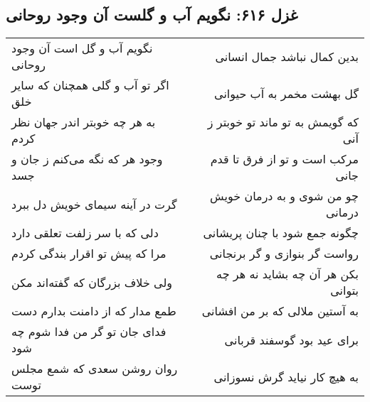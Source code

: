 \begin{center}
\section*{غزل ۶۱۶: نگویم آب و گلست آن وجود روحانی}
\label{sec:616}
\begin{longtable}{l p{0.5cm} r}
نگویم آب و گل است آن وجود روحانی
&&
بدین کمال نباشد جمال انسانی
\\
اگر تو آب و گلی همچنان که سایر خلق
&&
گل بهشت مخمر به آب حیوانی
\\
به هر چه خوبتر اندر جهان نظر کردم
&&
که گویمش به تو ماند تو خوبتر ز آنی
\\
وجود هر که نگه می‌کنم ز جان و جسد
&&
مرکب است و تو از فرق تا قدم جانی
\\
گرت در آینه سیمای خویش دل ببرد
&&
چو من شوی و به درمان خویش درمانی
\\
دلی که با سر زلفت تعلقی دارد
&&
چگونه جمع شود با چنان پریشانی
\\
مرا که پیش تو اقرار بندگی کردم
&&
رواست گر بنوازی و گر برنجانی
\\
ولی خلاف بزرگان که گفته‌اند مکن
&&
بکن هر آن چه بشاید نه هر چه بتوانی
\\
طمع مدار که از دامنت بدارم دست
&&
به آستین ملالی که بر من افشانی
\\
فدای جان تو گر من فدا شوم چه شود
&&
برای عید بود گوسفند قربانی
\\
روان روشن سعدی که شمع مجلس توست
&&
به هیچ کار نیاید گرش نسوزانی
\\
\end{longtable}
\end{center}
